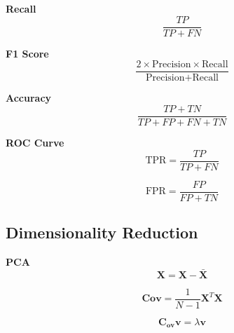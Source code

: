 \documentclass[8pt]{article}
\begin{document}
\begin{multicols}{2}
\textbf{Recall}
\begin{equation}
    \frac{TP}{TP + FN}
\end{equation}

\textbf{F1 Score}
\begin{equation}
    \frac{2 \times \text{Precision} \times \text{Recall}}{\text{Precision} + \text{Recall}}
\end{equation}

\textbf{Accuracy}
\begin{equation}
    \frac{TP + TN}{TP + FP + FN + TN}
\end{equation}

\textbf{ROC Curve}
\begin{equation}
    \text{TPR} = \frac{TP}{TP + FN}
\end{equation}

\begin{equation}
    \text{FPR} = \frac{FP}{FP + TN}
\end{equation}

\subsection*{Dimensionality Reduction}
\textbf{PCA}
\begin{equation}
    \mathbf{X} = \mathbf{X} - \bar{\mathbf{X}}
\end{equation}

\begin{equation}
    \mathbf{Cov} = \frac{1}{N - 1} \mathbf{X}^T \mathbf{X}
\end{equation}

\begin{equation}
    \mathbf{C_{ov}} \mathbf{v} = \lambda \mathbf{v}
\end{equation}

\end{multicols}
\end{document}
